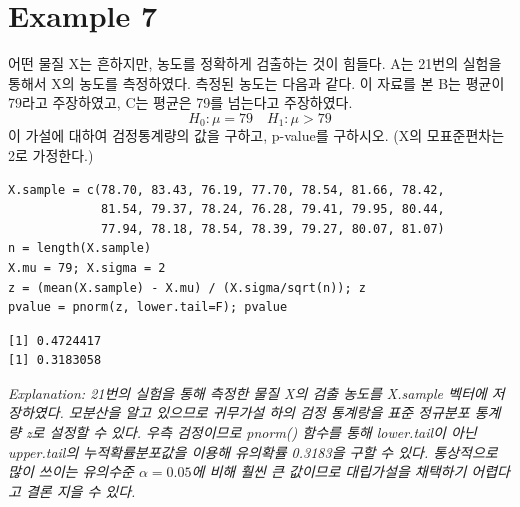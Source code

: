 \documentclass{article}
\begin{document}
\section*{Example 7}
어떤 물질 X는 흔하지만, 농도를 정확하게 검출하는 것이 힘들다. A는 21번의 실험을 통해서 X의 농도를 측정하였다. 측정된 농도는 다음과 같다.
\newline
{}
\newline
이 자료를 본 B는 평균이 79라고 주장하였고, C는 평균은 79를 넘는다고 주장하였다.
\begin{equation*}
H_0: \mu=79 \quad H_1: \mu>79
\end{equation*}
이 가설에 대하여 검정통계량의 값을 구하고, p-value를 구하시오. (X의 모표준편차는 2로 가정한다.) 
\begin{lstlisting}[style={r-style}]
X.sample = c(78.70, 83.43, 76.19, 77.70, 78.54, 81.66, 78.42, 
             81.54, 79.37, 78.24, 76.28, 79.41, 79.95, 80.44, 
             77.94, 78.18, 78.54, 78.39, 79.27, 80.07, 81.07)
n = length(X.sample)
X.mu = 79; X.sigma = 2
z = (mean(X.sample) - X.mu) / (X.sigma/sqrt(n)); z
pvalue = pnorm(z, lower.tail=F); pvalue
\end{lstlisting}
\begin{lstlisting}[style={out-style}]
[1] 0.4724417
[1] 0.3183058
\end{lstlisting}
\emph{Explanation: 21번의 실험을 통해 측정한 물질 X의 검출 농도를 X.sample 벡터에 저장하였다. 모분산을 알고 있으므로 귀무가설 하의 검정 통계랑을 표준 정규분포 통계량 z로 설정할 수 있다. 우측 검정이므로 pnorm() 함수를 통해 lower.tail이 아닌 upper.tail의 누적확률분포값을 이용해 유의확률 0.3183을 구할 수 있다. 통상적으로 많이 쓰이는 유의수준 $\alpha = 0.05$에 비해 훨씬 큰 값이므로 대립가설을 채택하기 어렵다고 결론 지을 수 있다. } \\
\end{document}
